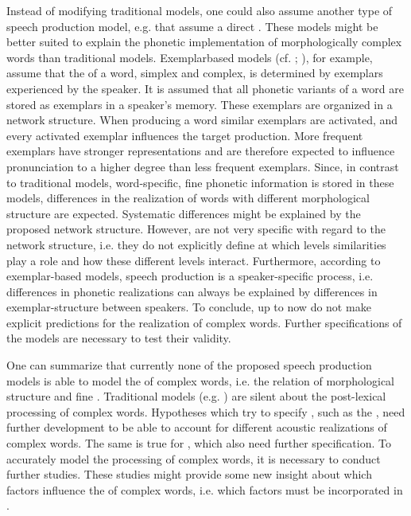 {{{ 
 Instead of modifying traditional models, one could also assume another type of speech production model, e.g.  that assume a direct . These models might be better suited to explain the phonetic implementation of morphologically complex words than traditional models. Exemplarbased models (cf. \citealt{Johnson.1997b,Pierrehumbert.2001,Pierrehumbert.2002}; \citealt{Bybee.2002}), for example, assume that the  of a word, simplex and complex, is determined by exemplars experienced by the speaker. It is assumed that all phonetic variants of a word are stored as exemplars in a speaker's memory. These exemplars are organized in a network structure. When producing a word similar exemplars are activated, and every activated exemplar influences the target production. More frequent exemplars have stronger representations and are therefore expected to influence pronunciation to a higher degree than less frequent exemplars. 
 Since, in contrast to traditional models, word-specific, fine phonetic  information is stored in these models, differences in the realization of words with different morphological structure are expected. Systematic differences might be explained by the proposed network structure.
 However,  are not very specific with regard to the network structure, i.e. they do not explicitly define at which levels similarities play a role and how these different levels interact. Furthermore, according to exemplar-based models, speech production is a speaker-specific process, i.e. differences in phonetic realizations can always be explained by differences in exemplar-structure between speakers. To conclude, up to now  do not make explicit predictions for the realization of complex words. Further specifications of the models are necessary to test their validity.
 

One can summarize that currently none of the proposed speech production models is able to model the  of complex words, i.e. the relation of morphological structure and fine .  Traditional models (e.g. \citealt{Dell.1986,Levelt.1999b}) are silent about the post-lexical processing of complex words. Hypotheses which try to specify , such as the , need further development to be able to account for different acoustic realizations of complex words. The same is true for , which also need further specification. To accurately model the processing of complex words, it is necessary to conduct further studies. 
These studies might provide some new insight about which factors influence the 
 of complex words, i.e. which factors must be incorporated in .
 
}}}
